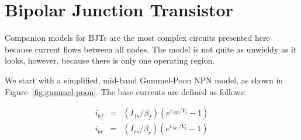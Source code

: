 \documentclass{article}
\begin{document}
\begin{table}[h]
\caption{PMOS companion model parameters \label{tb:pmos}}
\end{table}

\pagebreak

\section{Bipolar Junction Transistor}

Companion models for BJTs are the most complex circuits presented here because current flows between all nodes.  The model is not quite as unwieldy as it looks, however, because there is only one operating region.

We start with a simplified, mid-band Gummel-Poon NPN model, as shown in Figure~\ref{fig:gummel-poon}.  The base currents are defined as follows:

\begin{eqnarray}
i_{bf}&=&(I_{fs}/\beta_f)(e^{v_{BE}/V_t}-1) \\
i_{br}&=&(I_{rs}/\beta_r)(e^{v_{BC}/V_t}-1)
\end{eqnarray}
\end{document}
